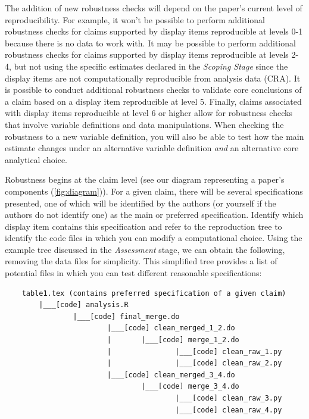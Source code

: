 \documentclass[]{book}
\begin{document}
The addition of new robustness checks will depend on the paper's current level of reproducibility. For example, it won't be possible to perform additional robustness checks for claims supported by display items reproducible at levels 0-1 because there is no data to work with. It may be possible to perform additional robustness checks for claims supported by display items reproducible at levels 2-4, but not using the specific estimates declared in the \emph{Scoping Stage} since the display items are not computationally reproducible from analysis data (CRA). It is possible to conduct additional robustness checks to validate core conclusions of a claim based on a display item reproducible at level 5. Finally, claims associated with display items reproducible at level 6 or higher allow for robustness checks that involve variable definitions and data manipulations. When checking the robustness to a new variable definition, you will also be able to test how the main estimate changes under an alternative variable definition \emph{and} an alternative core analytical choice.

Robustness begins at the claim level (see our diagram representing a paper's components (\ref{fig:diagram})). For a given claim, there will be several specifications presented, one of which will be identified by the authors (or yourself if the authors do not identify one) as the main or preferred specification. Identify which display item contains this specification and refer to the reproduction tree to identify the code files in which you can modify a computational choice. Using the example tree discussed in the \emph{Assessment} stage, we can obtain the following, removing the data files for simplicity. This simplified tree provides a list of potential files in which you can test different reasonable specifications:

\begin{verbatim}
    table1.tex (contains preferred specification of a given claim)
        |___[code] analysis.R
                |___[code] final_merge.do
                        |___[code] clean_merged_1_2.do
                        |       |___[code] merge_1_2.do
                        |               |___[code] clean_raw_1.py
                        |               |___[code] clean_raw_2.py
                        |___[code] clean_merged_3_4.do
                                |___[code] merge_3_4.do
                                        |___[code] clean_raw_3.py
                                        |___[code] clean_raw_4.py
                                        
\end{verbatim}
\end{document}
